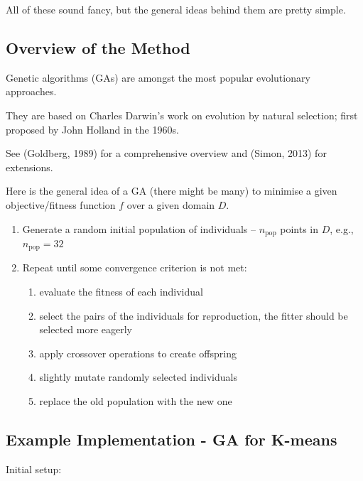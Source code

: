 \documentclass[10pt,b5paper,krantz1]{krantz}
\providecommand{\tightlist}{%
  \setlength{\itemsep}{0pt}\setlength{\parskip}{0pt}}
\begin{document}
All of these sound fancy, but the general ideas behind them are pretty simple.

\hypertarget{overview-of-the-method}{%
\subsection{Overview of the Method}\label{overview-of-the-method}}

Genetic algorithms (GAs) are amongst the most popular evolutionary approaches.

They are based on Charles Darwin's work on evolution by natural selection;
first proposed by John Holland in the 1960s.

See (Goldberg, 1989) for a comprehensive overview
and (Simon, 2013) for extensions.

Here is the general idea of a GA (there might be many)
to minimise a given objective/fitness function \(f\)
over a given domain \(D\).

\begin{enumerate}
\def\labelenumi{\arabic{enumi}.}
\item
  Generate a random initial population of individuals -- \(n_\text{pop}\) points in \(D\),
  e.g., \(n_\text{pop}=32\)
\item
  Repeat until some convergence criterion is not met:

  \begin{enumerate}
  \def\labelenumii{\alph{enumii}.}
  \tightlist
  \item
    evaluate the fitness of each individual
  \item
    select the pairs of the individuals for reproduction, the fitter
    should be selected more eagerly
  \item
    apply crossover operations to create offspring
  \item
    slightly mutate randomly selected individuals
  \item
    replace the old population with the new one
  \end{enumerate}
\end{enumerate}

\hypertarget{example-implementation---ga-for-k-means}{%
\subsection{Example Implementation - GA for K-means}\label{example-implementation---ga-for-k-means}}

Initial setup:
\end{document}
